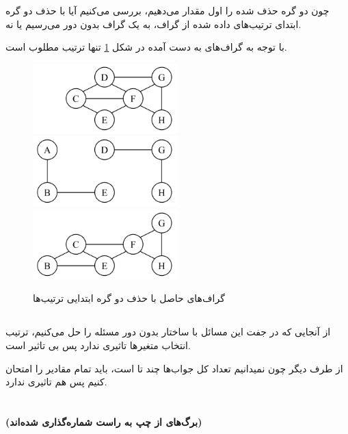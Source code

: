\documentclass{university}
\begin{document}
چون دو گره حذف شده را اول مقدار می‌دهیم، بررسی می‌کنیم آیا با حذف دو گره ابتدای ترتیب‌های داده شده از گراف، 
به یک گراف بدون دور می‌رسیم یا نه. 

با توجه به گراف‌های به دست آمده در شکل 
\ref{fig:cutset} 
تنها ترتیب 
مطلوب است. 

\begin{figure}
    \centering
    \includegraphics[width=0.5\textwidth]{./assets/2-2-1.png}
    \includegraphics[width=0.5\textwidth]{./assets/2-2-2.png}
    \includegraphics[width=0.5\textwidth]{./assets/2-2-3.png}
    \caption{گراف‌های حاصل با حذف دو گره ابتدایی ترتیب‌ها}
    \label{fig:cutset}
\end{figure}

\subsection{}
از آنجایی که در جفت این مسائل با ساختار بدون دور مسئله را حل می‌کنیم، ترتیب انتخاب متغیرها تاثیری ندارد 
پس 
بی تاثیر است.

از طرف دیگر چون نمیدانیم تعداد کل جواب‌ها چند تا است، باید تمام مقادیر را امتحان کنیم پس 
هم تاثیری ندارد.

\section{}

\textbf{(برگ‌های از چپ به راست شماره‌گذاری شده‌اند)} \\
\end{document}
